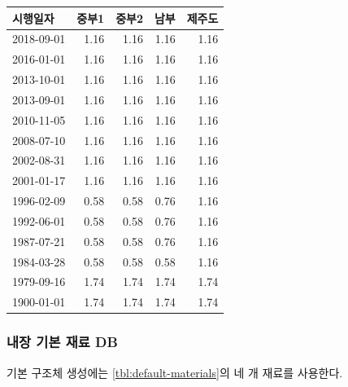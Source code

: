 \begin{defaulttable}
  \caption{\texttt{@vintage\_regulation} 층간바닥에 적용되는 열관류율
    $[\mathrm{W/(m^2K)}]$}
  \label{tbl:unknown-db-interfloor}
  {\small
  \renewcommand{\arraystretch}{1.05}
  \begin{tabular}{lrrrr}
    \toprule
    시행일자 & 중부1 & 중부2 & 남부 & 제주도 \\ \midrule
    2018-09-01 & 1.16 & 1.16 & 1.16 & 1.16 \\
    2016-01-01 & 1.16 & 1.16 & 1.16 & 1.16 \\
    2013-10-01 & 1.16 & 1.16 & 1.16 & 1.16 \\
    2013-09-01 & 1.16 & 1.16 & 1.16 & 1.16 \\
    2010-11-05 & 1.16 & 1.16 & 1.16 & 1.16 \\
    2008-07-10 & 1.16 & 1.16 & 1.16 & 1.16 \\
    2002-08-31 & 1.16 & 1.16 & 1.16 & 1.16 \\
    2001-01-17 & 1.16 & 1.16 & 1.16 & 1.16 \\
    1996-02-09 & 0.58 & 0.58 & 0.76 & 1.16 \\
    1992-06-01 & 0.58 & 0.58 & 0.76 & 1.16 \\
    1987-07-21 & 0.58 & 0.58 & 0.76 & 1.16 \\
    1984-03-28 & 0.58 & 0.58 & 0.58 & 1.16 \\
    1979-09-16 & 1.74 & 1.74 & 1.74 & 1.74 \\
    1900-01-01 & 1.74 & 1.74 & 1.74 & 1.74 \\
    \bottomrule
  \end{tabular}
  }
\end{defaulttable}

\subsubsection{내장 기본 재료 DB}

기본 구조체 생성에는 \cref{tbl:default-materials}의 네 개 재료를 사용한다.

